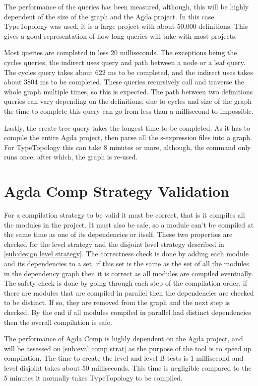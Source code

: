 The performance of the queries has been measured, although, this will be highly
dependent of the size of the graph and the Agda project. In this case
TypeTopology was used, it is a large project with about 50,000 definitions.
This gives a good representation of how long queries will take with most
projects. 

 Most queries
are completed in less 20 milliseconds. The exceptions being the cycles queries,
the indirect uses query and path between a node or a leaf query. The cycles
query takes about 622 ms to be completed, and the indirect uses takes about
3804 ms to be completed. These queries recursively call and traverse the whole
graph multiple times, so this is expected. The path between two definitions
queries can vary depending on the definitions, due to cycles and size of the
graph the time to complete this query can go from less than a millisecond to
impossible.

Lastly, the create tree query takes the longest time to be completed. As it has
to compile the entire Agda project, then parse all the s-expression files into
a graph. For TypeTopology this can take 8 minutes or more, although, the
command only runs once, after which, the graph is re-used.

\section{Agda Comp Strategy Validation}

For a compilation strategy to be valid it must be correct, that is it compiles
all the modules in the project. It must also be safe, so a module can't be
compiled at the same time as one of its dependencies or itself. These two
properties are checked for the level strategy and the disjoint level strategy
described in \cref{sub:design level strategy}. The correctness check is done by
adding each module and its dependencies to a set, if this set is the same as
the set of all the modules in the dependency graph then it is correct as all
modules are compiled eventually. The safety check is done by going through each
step of the compilation order, if there are modules that are compiled in
parallel then the dependencies are checked to be distinct. If so, they are
removed from the graph and the next step is checked. By the end if all modules
compiled in parallel had distinct dependencies then the overall compilation is
safe.

The performance of Agda Comp is highly dependent on the Agda project, and will
be assessed on \cref{sub:eval comp strat} as the purpose of the tool is to
speed up compilation. The time to create the level and level B tests is
1-millisecond and level disjoint takes about 50 milliseconds. This time is
negligible compared to the 5 minutes it normally takes TypeTopology to be
compiled.

